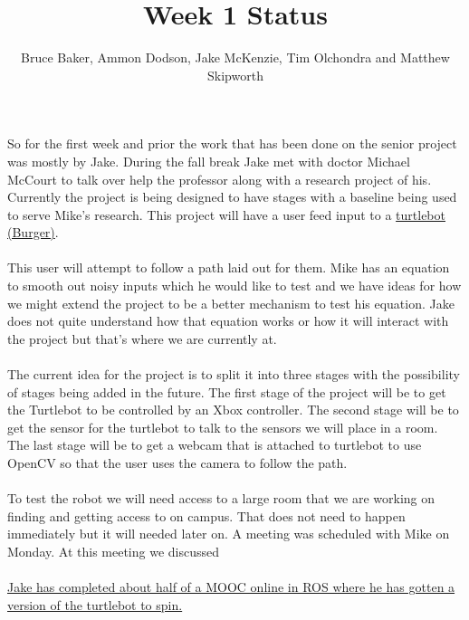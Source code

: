 \documentclass[12pt]{IEEEtran}
\begin{document}
\title{Week 1 Status}
\author{Bruce Baker, Ammon Dodson, Jake McKenzie, Tim Olchondra and Matthew Skipworth}
\maketitle
\noindent So for the first week and prior the work that has been done on the senior 
project was mostly by Jake. During the fall break Jake met with doctor 
Michael McCourt to talk over help the professor along with a research 
project of his. Currently the project is being designed to have stages with
a baseline being used to serve Mike's research. This project will have a user
feed input to a \href{http://wiki.ros.org/Robots/TurtleBot}{turtlebot (Burger)}.\\\\
This user will attempt to follow a path laid out for them. Mike has an equation
to smooth out noisy inputs which he would like to test and we have ideas
for how we might extend the project to be a better mechanism to test his equation.
Jake does not quite understand how that equation works or how it will interact with
the project but that's where we are currently at.\\\\
The current idea for the project is to split it into three stages with 
the possibility of stages being added in the future. The first stage of the
project will be to get the Turtlebot to be controlled by an Xbox controller.
The second stage will be to get the sensor for the turtlebot to talk to the sensors
we will place in a room. The last stage will be to get a webcam that is attached to
turtlebot to use OpenCV so that the user uses the camera to follow the path.\\\\
To test the robot we will need access to a large room that we are working on finding 
and getting access to on campus. That does not need to happen immediately but it will needed 
later on. A meeting was scheduled with Mike on Monday. At this meeting we discussed \\\\
\href{https://www.facebook.com/jake.mckenzie.16/videos/2450973201587222/}{Jake has completed about half of a MOOC online in ROS where he has gotten a version of
the turtlebot to spin.}
\end{document}
